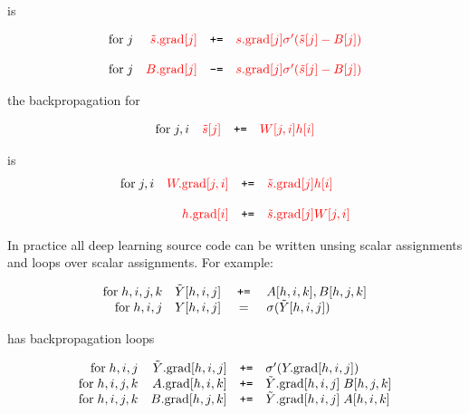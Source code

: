 {\vfill
is

\vfill
$$\begin{array}{lrcl}
\mathrm{for}\;j & {\color{red} \tilde{s}.\mathrm{grad}[j]} & \mbox{\tt +=} & {\color{red} s.\mathrm{grad}[j]\sigma'(\tilde{s}[j] - B[j])} \\
\\
\mathrm{for}\;j & {\color{red} B.\mathrm{grad}[j]} & \mbox{\tt -=} & {\color{red} s.\mathrm{grad}[j]\sigma'(\tilde{s}[j] - B[j])}
\end{array}$$

the backpropagation for

$$\begin{array}{lrcl}
\mathrm{for}\;j,i & {\color{red} \tilde{s}[j]} & \mbox{\tt +=} & {\color{red} W[j,i]h[i]}
\end{array}$$

\vfill
is
$$\begin{array}{lrcl}
\mathrm{for}\;j,i & {\color{red} W.\mathrm{grad}[j,i]} & \mbox{\tt +=} & {\color{red} \tilde{s}.\mathrm{grad}[j] h[i]} \\
\\
& {\color{red} h.\mathrm{grad}[i]} & \mbox{\tt +=} & {\color{red} \tilde{s}.\mathrm{grad}[j] W[j,i]} \\
\end{array}$$


In practice all deep learning source code can be written unsing scalar assignments and loops over scalar assignments.
For example:

$$\begin{array}{rrcl}
\mathrm{for}\; h,i,j,k & \tilde{Y}[h,i,j] & \;\mbox{\tt +=}\; & A[h,i,k],B[h,j,k] \\
\mathrm{for}\; h,i,j & Y[h,i,j] & = & \sigma(\tilde{Y}[h,i,j])
\end{array}$$

\vfill
has backpropagation loops

$$\begin{array}{rrcl}
\mathrm{for}\;h,i,j & \tilde{Y}.\mathrm{grad}[h,i,j] & \mbox{\tt +=} & \sigma'(Y.\mathrm{grad}[h,i,j]) \\
\mathrm{for}\;h,i,j,k & A.\mathrm{grad}[h,i,k] & \mbox{\tt +=} & \tilde{Y}.\mathrm{grad}[h,i,j] \;B[h,j,k] \\
\mathrm{for}\;h,i,j,k & B.\mathrm{grad}[h,j,k] & \mbox{\tt +=} & \tilde{Y}.\mathrm{grad}[h,i,j]\;A[h,i,k]
\end{array}$$

}



